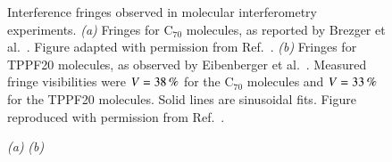\documentclass[3p,sort&compress]{elsarticle}
\begin{document}
\begin{figure}
\caption{Interference fringes observed in molecular interferometry experiments. \emph{(a)} Fringes for C$_{70}$ molecules, as reported by Brezger et al.\ \cite{Brezger:2002:mu}.  Figure adapted with permission from Ref.~\cite{Brezger:2002:mu}. \emph{(b)} Fringes for TPPF20 molecules, as observed by Eibenberger et al.\ \cite{Eibenberger:2013:az}. Measured fringe visibilities were $V=\unit[38]{\%}$ for the C$_{70}$ molecules and $V=\unit[33]{\%}$ for the TPPF20 molecules.  Solid lines are sinusoidal fits. Figure reproduced with permission from Ref.~\cite{Eibenberger:2013:az}.}
\label{fig:pattern}
\end{figure}

\begin{figure}
{\footnotesize  \hspace{.7cm} \emph{(a)} \hspace{7.3cm} \emph{(b)} }

\vspace{.2cm}


\end{figure}
\end{document}
